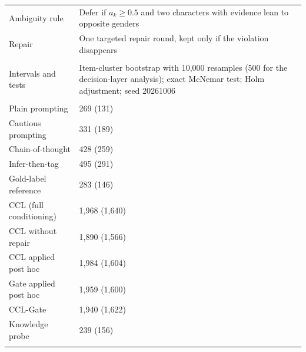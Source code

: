 \begin{table}[!htbp]
\begin{tabular*}{\textwidth}{@{\extracolsep\fill}L{3.4cm}L{9.0cm}@{}}
Ambiguity rule & Defer if $a_k\ge0.5$ and two characters with evidence lean to opposite genders \\
Repair & One targeted repair round, kept only if the violation disappears \\
\addlinespace
{}\\
Intervals and tests & Item-cluster bootstrap with 10,000 resamples (500 for the decision-layer analysis); exact McNemar test; Holm adjustment; seed 20261006 \\
\addlinespace
{}\\
Plain prompting & 269 (131) \\
Cautious prompting & 331 (189) \\
Chain-of-thought & 428 (259) \\
Infer-then-tag & 495 (291) \\
Gold-label reference & 283 (146) \\
CCL (full conditioning) & 1,968 (1,640) \\
CCL without repair & 1,890 (1,566) \\
CCL applied post hoc & 1,984 (1,604) \\
Gate applied post hoc & 1,959 (1,600) \\
CCL-Gate & 1,940 (1,622) \\
Knowledge probe & 239 (156) \\
\botrule
\end{tabular*}
\end{table}


